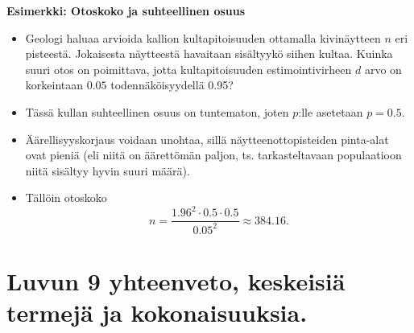 \documentclass[
]{book}
\begin{document}
\begin{eblock}{}

\textbf{Esimerkki: Otoskoko ja suhteellinen osuus}

\begin{itemize}
\item
  Geologi haluaa arvioida kallion kultapitoisuuden ottamalla kivinäytteen \(n\) eri pisteestä. Jokaisesta näytteestä havaitaan sisältyykö siihen kultaa. Kuinka suuri otos on poimittava, jotta kultapitoisuuden estimointivirheen \(d\) arvo on korkeintaan \(0.05\) todennäköisyydellä 0.95?
\item
  Tässä kullan suhteellinen osuus on tuntematon, joten \(p\):lle asetetaan \(p=0.5\).
\item
  Äärellisyyskorjaus voidaan unohtaa, sillä näytteenottopisteiden pinta-alat ovat pieniä (eli niitä on äärettömän paljon, ts. tarkasteltavaan populaatioon niitä sisältyy
  hyvin suuri määrä).
\item
  Tällöin otoskoko
  \[
  n = \frac{1.96^2 \cdot 0.5 \cdot 0.5}{0.05^2} \approx 384.16.
  \]
\end{itemize}

\end{eblock}

\hypertarget{luvun-9-yhteenveto-keskeisiuxe4-termejuxe4-ja-kokonaisuuksia.}{%
\section{Luvun 9 yhteenveto, keskeisiä termejä ja kokonaisuuksia.}\label{luvun-9-yhteenveto-keskeisiuxe4-termejuxe4-ja-kokonaisuuksia.}}
\end{document}
